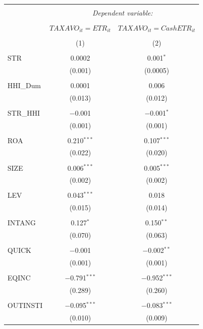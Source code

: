 \documentclass[a4paper]{article}\usepackage[]{graphicx}\usepackage[]{color}
\begin{document}
\begin{table}[!htbp] \centering 
  \caption{} 
  \label{E2} 
\begin{tabular}{@{\extracolsep{5pt}}lcc} 
\\[-1.8ex]\hline 
\hline \\[-1.8ex] 
 & \multicolumn{2}{c}{\textit{Dependent variable:}} \\ 
\cline{2-3} 
\\[-1.8ex] & $TAXAVO_{it}=ETR_{it}$ & $TAXAVO_{it}=CashETR_{it}$ \\ 
\\[-1.8ex] & (1) & (2)\\ 
\hline \\[-1.8ex] 
 STR & 0.0002 & 0.001$^{*}$ \\ 
  & (0.001) & (0.0005) \\ 
  & & \\ 
 HHI\_Dum & 0.0001 & 0.006 \\ 
  & (0.013) & (0.012) \\ 
  & & \\ 
 STR\_HHI & $-$0.001 & $-$0.001$^{*}$ \\ 
  & (0.001) & (0.001) \\ 
  & & \\ 
 ROA & 0.210$^{***}$ & 0.107$^{***}$ \\ 
  & (0.022) & (0.020) \\ 
  & & \\ 
 SIZE & 0.006$^{***}$ & 0.005$^{***}$ \\ 
  & (0.002) & (0.002) \\ 
  & & \\ 
 LEV & 0.043$^{***}$ & 0.018 \\ 
  & (0.015) & (0.014) \\ 
  & & \\ 
 INTANG & 0.127$^{*}$ & 0.150$^{**}$ \\ 
  & (0.070) & (0.063) \\ 
  & & \\ 
 QUICK & $-$0.001 & $-$0.002$^{**}$ \\ 
  & (0.001) & (0.001) \\ 
  & & \\ 
 EQINC & $-$0.791$^{***}$ & $-$0.952$^{***}$ \\ 
  & (0.289) & (0.260) \\ 
  & & \\ 
 OUTINSTI & $-$0.095$^{***}$ & $-$0.083$^{***}$ \\ 
  & (0.010) & (0.009) \\ 

\end{tabular}
\end{table}
\end{document}
